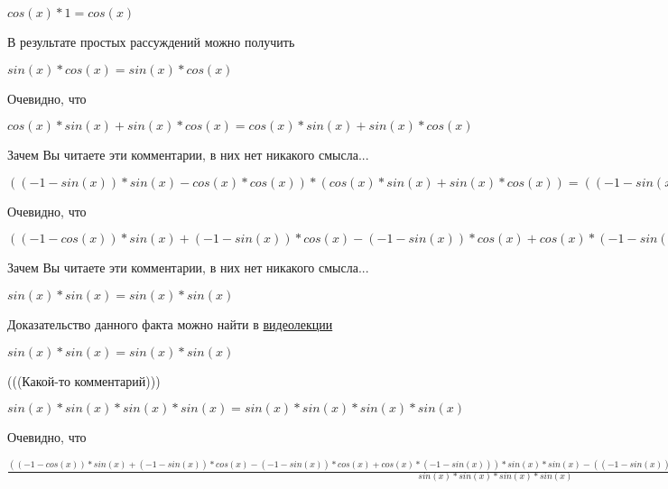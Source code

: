 \documentclass[12pt,a4paper,fleqn]{article}
\theoremstyle{definition}
\begin{document}
$cos( x ) *  1  = cos( x )$

В результате простых рассуждений можно получить 

$sin( x ) * cos( x ) = sin( x ) * cos( x )$

Очевидно, что 

$cos( x ) * sin( x ) + sin( x ) * cos( x ) = cos( x ) * sin( x ) + sin( x ) * cos( x )$

Зачем Вы читаете эти комментарии, в них нет никакого смысла... 

$(( -1  - sin( x )) * sin( x ) - cos( x ) * cos( x )) * (cos( x ) * sin( x ) + sin( x ) * cos( x )) = (( -1  - sin( x )) * sin( x ) - cos( x ) * cos( x )) * (cos( x ) * sin( x ) + sin( x ) * cos( x ))$

Очевидно, что 

$(( -1  - cos( x )) * sin( x ) + ( -1  - sin( x )) * cos( x ) - ( -1  - sin( x )) * cos( x ) + cos( x ) * ( -1  - sin( x ))) * sin( x ) * sin( x ) - (( -1  - sin( x )) * sin( x ) - cos( x ) * cos( x )) * (cos( x ) * sin( x ) + sin( x ) * cos( x )) = (( -1  - cos( x )) * sin( x ) + ( -1  - sin( x )) * cos( x ) - ( -1  - sin( x )) * cos( x ) + cos( x ) * ( -1  - sin( x ))) * sin( x ) * sin( x ) - (( -1  - sin( x )) * sin( x ) - cos( x ) * cos( x )) * (cos( x ) * sin( x ) + sin( x ) * cos( x ))$

Зачем Вы читаете эти комментарии, в них нет никакого смысла... 

$sin( x ) * sin( x ) = sin( x ) * sin( x )$

Доказательство данного факта можно найти в \href{https://www.youtube.com/watch?v=dQw4w9WgXcQ}{видеолекции} 

$sin( x ) * sin( x ) = sin( x ) * sin( x )$

(((Какой-то комментарий))) 

$sin( x ) * sin( x ) * sin( x ) * sin( x ) = sin( x ) * sin( x ) * sin( x ) * sin( x )$

Очевидно, что 

$\frac{(( -1  - cos( x )) * sin( x ) + ( -1  - sin( x )) * cos( x ) - ( -1  - sin( x )) * cos( x ) + cos( x ) * ( -1  - sin( x ))) * sin( x ) * sin( x ) - (( -1  - sin( x )) * sin( x ) - cos( x ) * cos( x )) * (cos( x ) * sin( x ) + sin( x ) * cos( x ))}{sin( x ) * sin( x ) * sin( x ) * sin( x )}
 = \frac{(( -1  - cos( x )) * sin( x ) + ( -1  - sin( x )) * cos( x ) - ( -1  - sin( x )) * cos( x ) + cos( x ) * ( -1  - sin( x ))) * sin( x ) * sin( x ) - (( -1  - sin( x )) * sin( x ) - cos( x ) * cos( x )) * (cos( x ) * sin( x ) + sin( x ) * cos( x ))}{sin( x ) * sin( x ) * sin( x ) * sin( x )}
$
\end{document}
